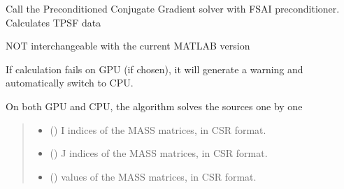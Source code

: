 \documentclass[letterpaper,10pt,english]{sphinxmanual}
\begin{document}
\begin{fulllineitems}
\label{\detokenize{_autosummary/nirfasterff.math.get_field_TR:nirfasterff.math.get_field_TR}}
\pysigstartsignatures
{}
\pysigstopsignatures
\sphinxAtStartPar
Call the Preconditioned Conjugate Gradient solver with FSAI preconditioner. Calculates TPSF data

\sphinxAtStartPar
NOT interchangeable with the current MATLAB version

\sphinxAtStartPar
If calculation fails on GPU (if chosen), it will generate a warning and automatically switch to CPU.

\sphinxAtStartPar
On both GPU and CPU, the algorithm solves the sources one by one
\begin{quote}\begin{description}
\begin{itemize}
\item {} 
\sphinxAtStartPar
{} (\sphinxstyleliteralemphasis{\sphinxupquote{, }}) \textendash{} I indices of the MASS matrices, in CSR format.

\item {} 
\sphinxAtStartPar
{} (\sphinxstyleliteralemphasis{\sphinxupquote{, }}) \textendash{} J indices of the MASS matrices, in CSR format.

\item {} 
\sphinxAtStartPar
{} () \textendash{} 
\sphinxAtStartPar
values of the MASS matrices, in CSR format.


\end{itemize}
\end{description}
\end{quote}
\end{fulllineitems}
\end{document}
